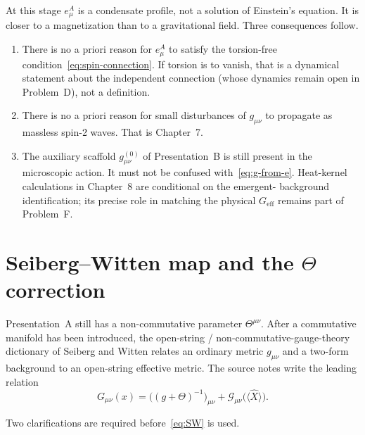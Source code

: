 At this stage \(e^A_\mu\) is a condensate profile, not a solution of
Einstein's equation. It is closer to a magnetization than to a
gravitational field. Three consequences follow.

\begin{enumerate}
  \item There is no a priori reason for \(e^A_\mu\) to satisfy the
        torsion-free condition~\eqref{eq:spin-connection}. If torsion
        is to vanish, that is a dynamical statement about the
        independent connection (whose dynamics remain open in
        Problem~D), not a definition.
  \item There is no a priori reason for small disturbances of
        \(g_{\mu\nu}\) to propagate as massless spin-2 waves. That is
        Chapter~7.
  \item The auxiliary scaffold \(g^{(0)}_{\mu\nu}\) of
        Presentation~B is still present in the microscopic action.
        It must not be confused with~\eqref{eq:g-from-e}. Heat-kernel
        calculations in Chapter~8 are conditional on the emergent-
        background identification; its precise role in matching the
        physical \(G_{\mathrm{eff}}\) remains part of Problem~F.
\end{enumerate}

\section{Seiberg--Witten map and the \(\Theta\) correction}
\label{sec:ch4-SW}

Presentation~A still has a non-commutative parameter
\(\Theta^{\mu\nu}\). After a commutative manifold has been introduced,
the open-string / non-commutative-gauge-theory dictionary of Seiberg
and Witten relates an ordinary metric \(g_{\mu\nu}\) and a two-form
background to an open-string effective metric. The source notes write
the leading relation
\begin{equation}
  \label{eq:SW}
  G_{\mu\nu}(x)
  =\bigl((g+\Theta)^{-1}\bigr)_{\mu\nu}
   +\mathcal{G}_{\mu\nu}\bigl(\langle\hat X\rangle\bigr).
\end{equation}

Two clarifications are required before~\eqref{eq:SW} is used.

